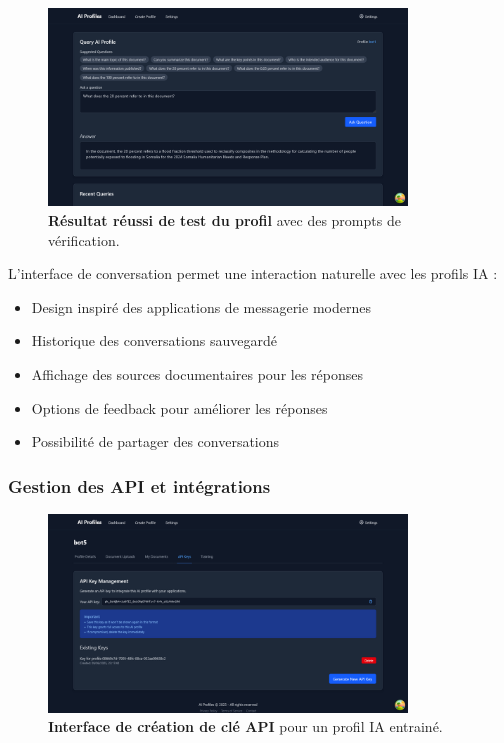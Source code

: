 \begin{figure}[H]
  \centering
  \includegraphics[width=0.85\textwidth,keepaspectratio]{pfe-pics/ai-profile-creation/chat_interface_for_testing_profile_2_test_prompt_succes.png}
  \caption{\textbf{Résultat réussi de test du profil} avec des prompts de vérification.}
  \label{fig:profile_test_success}
\end{figure}

L'interface de conversation permet une interaction naturelle avec les profils IA :

\begin{itemize}
  \item Design inspiré des applications de messagerie modernes
  \item Historique des conversations sauvegardé
  \item Affichage des sources documentaires pour les réponses
  \item Options de feedback pour améliorer les réponses
  \item Possibilité de partager des conversations
\end{itemize}

\subsubsection{Gestion des API et intégrations}

\begin{figure}[H]
  \centering
  \includegraphics[width=0.85\textwidth,keepaspectratio]{pfe-pics/ai-profile-creation/create_and_api_key_for_trained_profile.png}
  \caption{\textbf{Interface de création de clé API} pour un profil IA entrainé.}
  \label{fig:api_key_creation}
\end{figure}

